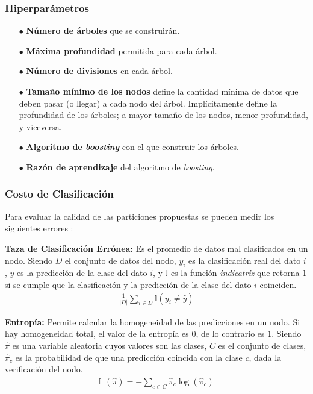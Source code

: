 \subsubsection{Hiperparámetros}

\begin{itemize}
    \item[$\bullet$] \textbf{Número de árboles} que se construirán.
    \item[$\bullet$] \textbf{Máxima profundidad} permitida para cada árbol.
    \item[$\bullet$] \textbf{Número de divisiones} en cada árbol.
    \item[$\bullet$] \textbf{Tamaño mínimo de los nodos} define la cantidad mínima de datos que deben pasar (o llegar) a cada nodo del árbol. Implícitamente define la profundidad de los árboles; a mayor tamaño de los nodos, menor profundidad, y viceversa.
    \item[$\bullet$] \textbf{Algoritmo de \emph{boosting}} con el que construir los árboles.
    \item[$\bullet$] \textbf{Razón de aprendizaje} del algoritmo de \emph{boosting}.
\end{itemize}

\subsubsection{Costo de Clasificación}
Para evaluar la calidad de las particiones propuestas se pueden medir los siguientes errores \cite{Murphy}:

\textbf{Taza de Clasificación Errónea:} Es el promedio de datos mal clasificados en un nodo. Siendo $D$ el conjunto de datos del nodo, $y_i$ es la clasificación real del dato $i$, $\hat{y}$ es la predicción de la clase del dato $i$, y $\mathbb{I}$ es la función \textit{indicatriz} que retorna $1$ si se cumple que la clasificación y la predicción de la clase del dato $i$ coinciden.
\begin{align}
 \frac{1}{|D|} \sum_{i \in D} \mathbb{I}(y_i \neq \hat{y})
\end{align} 

\textbf{Entropía:} Permite calcular la homogeneidad de las predicciones en un nodo. Si hay homogeneidad total, el valor de la entropía es $0$, de lo contrario es $1$. Siendo $\hat{\pi}$ es una variable aleatoria cuyos valores son las clases, $C$ es el conjunto de clases, $\hat{\pi}_c$ es la probabilidad de que una predicción coincida con la clase $c$, dada la verificación del nodo.
\begin{align}
 \mathbb{H}(\hat{\pi}) = -\sum_{c \in C} \hat{\pi}_c \log(\hat{\pi}_c)
\end{align} 

